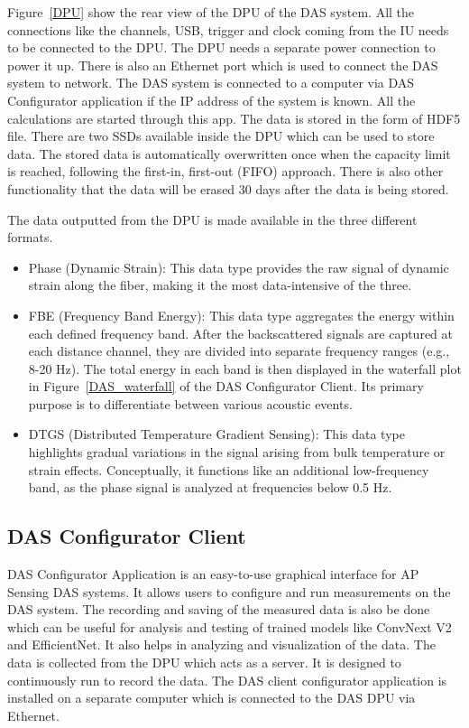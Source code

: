 Figure~\ref{DPU} show the rear view of the DPU of the DAS system. All the connections like the channels, USB, trigger and clock coming from the IU needs to be connected to the DPU. The DPU needs a separate power connection to power it up. There is also an Ethernet port which is used to connect the DAS system to network. The DAS system is connected to a computer via DAS Configurator application if the IP address of the system is known. All the calculations are started through this app. The data is stored in the form of HDF5 file. There are two SSDs available inside the DPU which can be used to store data. The stored data is automatically overwritten once when the capacity limit is reached, following the first-in, first-out (FIFO) approach. There is also other functionality that the data will be erased 30 days after the data is being stored. 

The data outputted from the DPU is made available in the three different formats. 

\begin{itemize} 
    \item{Phase (Dynamic Strain):} 
    This data type provides the raw signal of dynamic strain along the fiber, making it the most data-intensive of the three.

    \item{FBE (Frequency Band Energy):} 
    This data type aggregates the energy within each defined frequency band. After the backscattered signals are captured at each distance channel, they are divided into separate frequency ranges (e.g., 8-20 Hz). The total energy in each band is then displayed in the waterfall plot in Figure~\ref{DAS_waterfall} of the DAS Configurator Client. Its primary purpose is to differentiate between various acoustic events.

    \item{DTGS (Distributed Temperature Gradient Sensing):} 
    This data type highlights gradual variations in the signal arising from bulk temperature or strain effects. Conceptually, it functions like an additional low-frequency band, as the phase signal is analyzed at frequencies below 0.5 Hz.
\end{itemize}


\subsection{DAS Configurator Client}\label{sec:config_app}
DAS Configurator Application is an easy-to-use graphical interface for AP Sensing DAS systems. It allows users to configure and run measurements on the DAS system. The recording and saving of the measured data is also be done which can be useful for analysis and testing of trained models like ConvNext V2 and EfficientNet. It also helps in analyzing and visualization of the data. The data is collected from the DPU which acts as a server. It is designed to continuously run to record the data. The DAS client configurator application is installed on a separate computer which is connected to the DAS DPU via Ethernet. 

